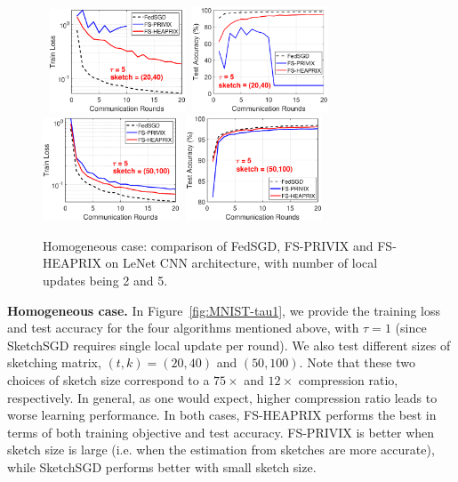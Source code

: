 \begin{figure}[h]
\begin{center}
		\mbox{			    \includegraphics[width=1.6in]{MNIST_figures/local5_sketch20_iid1_train_loss.eps}
		\includegraphics[width=1.6in]{MNIST_figures/local5_sketch20_iid1_test_acc.eps}
		\includegraphics[width=1.6in]{MNIST_figures/local5_sketch50_iid1_train_loss.eps}
		\includegraphics[width=1.6in]{MNIST_figures/local5_sketch50_iid1_test_acc.eps}
		}
	\end{center}
	\caption{Homogeneous case: comparison of FedSGD, FS-PRIVIX and FS-HEAPRIX on LeNet CNN architecture, with number of local updates being 2 and 5.}
    \label{fig:MNIST-tau2,tau5}
\end{figure}


\textbf{Homogeneous case.} In Figure~\ref{fig:MNIST-tau1}, we provide the training loss and test accuracy for the four algorithms mentioned above, with $\tau=1$ (since SketchSGD requires single local update per round). 
We also test different sizes of sketching matrix, $(t,k)=(20,40)$ and $(50,100)$. Note that these two choices of sketch size correspond to a $75\times$ and $12\times$ compression ratio, respectively. 
In general, as one would expect, higher compression ratio leads to worse learning performance. In both cases, FS-HEAPRIX performs the best in terms of both training objective and test accuracy. FS-PRIVIX is better when sketch size is large (i.e. when the estimation from sketches are more accurate), while SketchSGD performs better with small sketch size. 


